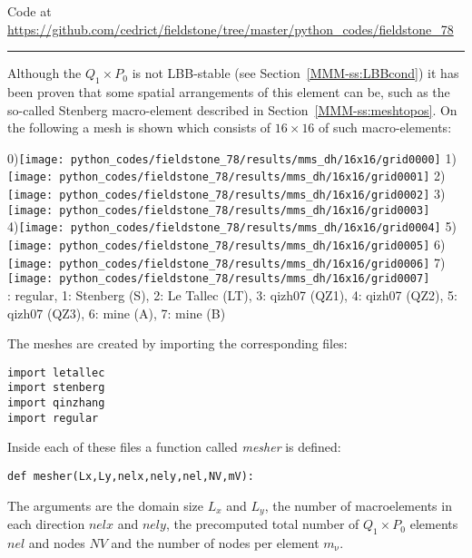 

\begin{center}
Code at \url{https://github.com/cedrict/fieldstone/tree/master/python_codes/fieldstone_78}
\end{center}

\par\noindent\rule{\textwidth}{0.4pt}



Although the $Q_1\times P_0$ is not LBB-stable (see Section~\ref{MMM-ss:LBBcond})
it has been proven that some spatial arrangements of this element can be, such as the
so-called Stenberg macro-element described in Section~\ref{MMM-ss:meshtopos}.
On the following a mesh is shown which consists of $16\times 16$ of such macro-elements:

\begin{center}
0)\texttt{[image: python\_codes/fieldstone\_78/results/mms\_dh/16x16/grid0000]}
1)\texttt{[image: python\_codes/fieldstone\_78/results/mms\_dh/16x16/grid0001]}
2)\texttt{[image: python\_codes/fieldstone\_78/results/mms\_dh/16x16/grid0002]}
3)\texttt{[image: python\_codes/fieldstone\_78/results/mms\_dh/16x16/grid0003]}\\
4)\texttt{[image: python\_codes/fieldstone\_78/results/mms\_dh/16x16/grid0004]}
5)\texttt{[image: python\_codes/fieldstone\_78/results/mms\_dh/16x16/grid0005]}
6)\texttt{[image: python\_codes/fieldstone\_78/results/mms\_dh/16x16/grid0006]}
7)\texttt{[image: python\_codes/fieldstone\_78/results/mms\_dh/16x16/grid0007]}\\
{: regular, 
1: Stenberg (S),
2: Le Tallec (LT),
3: qizh07 (QZ1),
4: qizh07 (QZ2),
5: qizh07 (QZ3),
6: mine (A),
7: mine (B)}
\end{center}

The meshes are created by importing the corresponding files:
\begin{lstlisting} 
import letallec
import stenberg
import qinzhang
import regular
\end{lstlisting} 
Inside each of these files a function called {\sl mesher} is defined: 
\begin{lstlisting} 
def mesher(Lx,Ly,nelx,nely,nel,NV,mV):
\end{lstlisting} 
The arguments are the domain size $L_x$ and $L_y$, the number of macroelements
in each direction $nelx$ and $nely$, the precomputed total number of $Q_1\times P_0$ 
elements $nel$ and nodes $NV$ and the number of nodes per element $m_\upnu$.  

